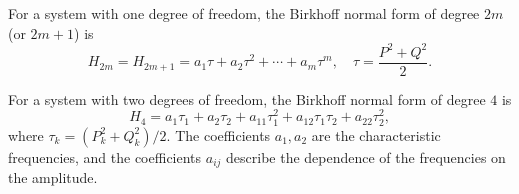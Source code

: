 For a system with one degree of freedom, the Birkhoff normal form of degree $2m$ (or $2m+1$) is
$$H_{2m} = H_{2m+1} = a_1 \tau + a_2 \tau^2 + \cdots + a_m \tau^m, \quad \tau = \frac{P^2 + Q^2}{2}.$$

For a system with two degrees of freedom, the Birkhoff normal form of degree $4$ is
$$H_4 = a_1 \tau_1 + a_2 \tau_2 + a_{11} \tau_1^2 + a_{12} \tau_1 \tau_2 + a_{22} \tau_2^2,$$
where $\tau_k = (P_k^2 + Q_k^2)/2$. The coefficients $a_1, a_2$ are the characteristic frequencies, and the coefficients $a_{ij}$ describe the dependence of the frequencies on the amplitude.
